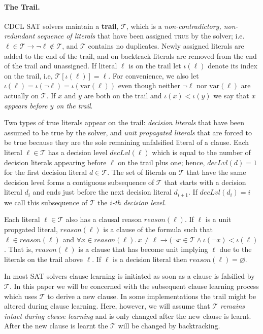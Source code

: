 \documentclass[runningheads]{llncs}
\newcommand{\sat}{SAT\xspace}
\newcommand{\trail}{\ensuremath{\mathcal{T}}}
\newcommand{\trailIdx}[1]{\ensuremath{\iota(#1)}}
\newcommand{\dlevel}[1]{\ensuremath{\mathit{decLvl}(#1)}}
\newcommand{\var}{\text{var}}
\newcommand{\true}{\textsc{true}\xspace}
\newcommand{\reason}[1]{\ensuremath{\mathit{reason}(#1)}}
\renewcommand{\implies}{\rightarrow}
\begin{document}
\paragraph{The Trail.}
CDCL \sat solvers maintain a \textbf{trail}, $\trail$, which is a
\textit{non-contradictory, non-redundant sequence of literals} that
have been assigned \true by the solver; i.e.
$\ell\in\trail \implies \lnot\ell \not\in\trail$, and $\trail$
contains no duplicates. Newly assigned literals are added to the end
of the trail, and on backtrack literals are removed from the end of
the trail and unassigned.  If literal $\ell$ is on the trail let
$\trailIdx{\ell}$ denote its index on the trail, i.e,
$\trail[\trailIdx{\ell}] = \ell$. For convenience, we also let
$\trailIdx{\ell} = \trailIdx{\lnot \ell} = \trailIdx{\var(\ell)}$ even
though neither $\lnot \ell$ nor $\var(\ell)$ are actually on
$\trail$. If $x$ and $y$ are both on the trail and
$\trailIdx{x} < \trailIdx{y}$ we say that \textit{$x$ appears before
  $y$ on the trail}. 

Two types of true literals appear on the trail: \emph{decision
  literals} that have been assumed to be true by the solver, and
\emph{unit propagated literals} that are forced to be true because
they are the sole remaining unfalsified literal of a clause. Each
literal $\ell\in\trail$ has a decision level $\dlevel{\ell}$ which is
equal to the number of decision literals appearing before $\ell$ on
the trail plus one; hence, $\dlevel{d}=1$ for the first decision
literal $d\in\trail$.  The set of literals on $\trail$ that have the
same decision level forms a contiguous subsequence of $\trail$ that
starts with a decision literal $d_i$ and ends just before the next
decision literal $d_{i+1}$. If $\dlevel{d_i} = i$ we call this
subsequence of $\trail$ the \textit{$i$-th decision level}.

Each literal $\ell\in\trail$ also has a clausal reason
$\reason{\ell}$. If $\ell$ is a unit propgated literal,
$\reason{\ell}$ is a clause of the formula such that
$\ell \in \reason{\ell}$ and
$\forall x \in \reason{\ell}.\, x\neq \ell \implies (\lnot x \in
\trail \land \trailIdx{\lnot x} < \trailIdx{\ell}$. That is,
$\reason{\ell}$ is a clause that has become unit implying $\ell$ due
to the literals on the trail above $\ell$. If $\ell$ is a decision
literal then $\reason{\ell} = \varnothing$.

In most \sat solvers clause learning is initiated as soon as a clause
is falsified by $\trail$. In this paper we will be concerned with the
subsequent clause learning process which uses $\trail$ to derive a new
clause. In some implementations the trail might be altered during
clause learning. Here, however, we will assume that $\trail$
\emph{remains intact during clause learning} and is only changed after
the new clause is learnt. After the new clause is learnt the $\trail$
will be changed by backtracking.
\end{document}
